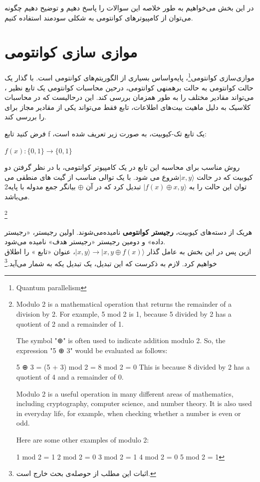 \documentclass{book}
\begin{document}
در این بخش می‌خواهیم به طور خلاصه این سوالات را پاسخ دهیم و توضیح دهیم چگونه می‌توان از کامپیوتر‌های کوانتومی به شکلی سودمند استفاده کنیم.

\section{موازی سازی کوانتومی}

موازی‌سازی کوانتومی\footnote{Quantum parallelism}، پایه‌واساس بسیاری از الگوریتم‌های کوانتومی است. با گذار یک حالت کوانتومی به حالت برهمنهی کوانتومی، درحین محاسبات کوانتومی یک تابع نظیر ، می‌تواند مقادیر مختلف  را به طور همزمان بررسی کند. این درحالیست که در محاسبات کلاسیک به دلیل ماهیت بیت‌های اطلاعات، تابع  فقط می‌تواند یکی از مقادیر مجاز برای  را بررسی کند.


فرض کنید تابع f ،یک تابع تک-کیوبیت، به صورت زیر تعریف شده است:\\
\begin{center}
	$f (x) : \{0, 1\} \rightarrow \{0, 1\}$\\
\end{center}

روش مناسب برای محاسبه این تابع در یک کامپیوتر کوانتومی، با در نظر گرفتن دو کیوبیت که در حالت $\vert x, y\rangle$شروع می شود. با یک توالی مناسب از گیت های منطقی می توان این حالت را به $\vert f(x) \oplus x, y\rangle$ تبدیل کرد که در آن $\oplus$ بیانگر جمع مدوله با پایه‌2 می‌باشد.

\footnote{Modulo 2 is a mathematical operation that returns the remainder of a division by 2. For example, 5 mod 2 is 1, because 5 divided by 2 has a quotient of 2 and a remainder of 1.
	
	The symbol "⊕" is often used to indicate addition modulo 2. So, the expression "5 ⊕ 3" would be evaluated as follows:
	
	5 ⊕ 3 = (5 + 3) mod 2 = 8 mod 2 = 0
	This is because 8 divided by 2 has a quotient of 4 and a remainder of 0.
	
	Modulo 2 is a useful operation in many different areas of mathematics, including cryptography, computer science, and number theory. It is also used in everyday life, for example, when checking whether a number is even or odd.
	
	Here are some other examples of modulo 2:
	
	1 mod 2 = 1
	2 mod 2 = 0
	3 mod 2 = 1
	4 mod 2 = 0
	5 mod 2 = 1}

هریک از دسته‌های کیوبیت، \textbf{رجیستر کوانتومی} نامیده‌می‌شوند. اولین رجیستر، «رجیستر داده» و دومین رجیستر «رجیستر هدف» نامیده می‌شود.\\
ازین پس در این بخش به عامل گذار $\vert x, y \rangle \rightarrow \vert x, y \oplus f(x) \rangle$، عنوان «تابع » را اطلاق خواهیم کرد. لازم به ذکرست که این تبدیل، یک تبدیل یکه به شمار می‌آید.\footnote{اثبات این مطلب از حوصله‌ی بحث خارج است.}
\end{document}
